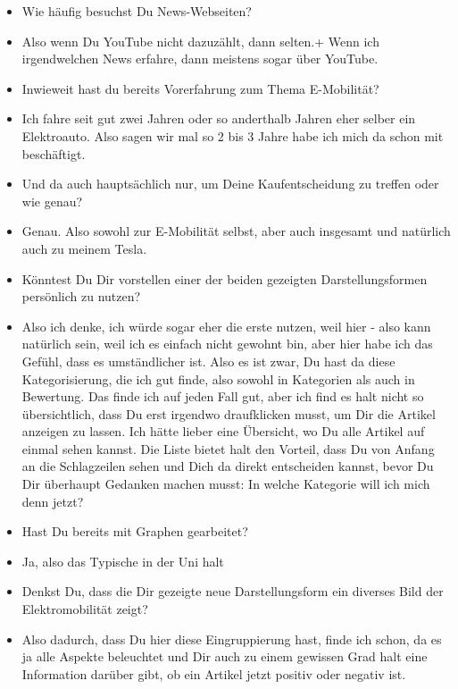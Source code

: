 {\begin{itemize}[]
    Aber nicht nur vertikal, sondern auch horizontal angeordnet.
    Ähnlich wie auf der YouTube-Startseite.
    Also ebenfalls mit Kategorien beziehungsweise Rubriken.
    Und dann halt typische Internetforen.
    \item {} Wie häufig besuchst Du News-Webseiten?
    \item {} Also wenn Du YouTube nicht dazuzählt, dann selten.+
    Wenn ich irgendwelchen News erfahre, dann meistens sogar über YouTube.
    \item {} Inwieweit hast du bereits Vorerfahrung zum Thema E-Mobilität?
    \item {} Ich fahre seit gut zwei Jahren oder so anderthalb Jahren eher selber ein Elektroauto.
    Also sagen wir mal so 2 bis 3 Jahre habe ich mich da schon mit beschäftigt. 
    \item {} Und da auch hauptsächlich nur, um Deine Kaufentscheidung zu treffen oder wie genau?
    \item {} Genau. 
    Also sowohl zur E-Mobilität selbst, aber auch insgesamt und natürlich auch zu meinem Tesla.
    \item {} Könntest Du Dir vorstellen einer der beiden gezeigten Darstellungsformen persönlich zu nutzen?
    \item {} Also ich denke, ich würde sogar eher die erste nutzen, weil hier - also kann natürlich sein, weil ich es einfach nicht gewohnt bin, aber hier habe ich das Gefühl, dass es umständlicher ist.
    Also es ist zwar, Du hast da diese Kategorisierung, die ich gut finde, also sowohl in Kategorien als auch in Bewertung.
    Das finde ich auf jeden Fall gut, aber ich find es halt nicht so übersichtlich, dass Du erst irgendwo draufklicken musst, um Dir die Artikel anzeigen zu lassen.
    Ich hätte lieber eine Übersicht, wo Du alle Artikel auf einmal sehen kannst.
    Die Liste bietet halt den Vorteil, dass Du von Anfang an die Schlagzeilen sehen und Dich da direkt entscheiden kannst, bevor Du Dir überhaupt Gedanken machen musst: In welche Kategorie will ich mich denn jetzt?
    \item {} Hast Du bereits mit Graphen gearbeitet?
    \item {} Ja, also das Typische in der Uni halt
    \item {} Denkst Du, dass die Dir gezeigte neue Darstellungsform ein diverses Bild der Elektromobilität zeigt?
    \item {} Also dadurch, dass Du hier diese Eingruppierung hast, finde ich schon, da es ja alle Aspekte beleuchtet und Dir auch zu einem gewissen Grad halt eine Information darüber gibt, ob ein Artikel jetzt positiv oder negativ ist.

\end{itemize}}
